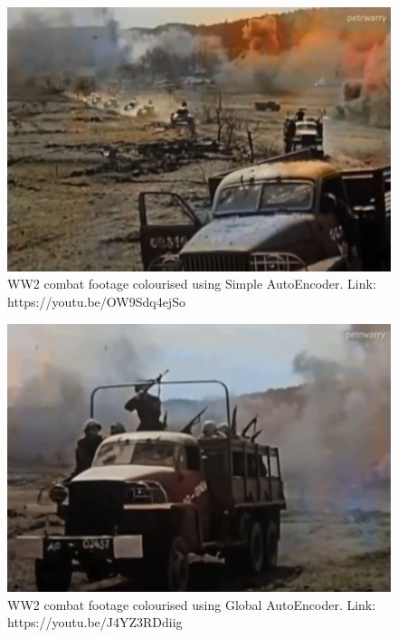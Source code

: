 \begin{figure}[H]
    \centering
    \includegraphics[width=1\columnwidth]{sections/appendix/ww2_colourisation1.JPG}
    \caption{WW2 combat footage colourised using Simple AutoEncoder. Link: https://youtu.be/OW9Sdq4ejSo}
    \label{fig:my_label}
\end{figure}


\begin{figure}[H]
    \centering
    \includegraphics[width=1\columnwidth]{sections/appendix/ww2_colourisation2.JPG}
    \caption{WW2 combat footage colourised using Global AutoEncoder. Link: https://youtu.be/J4YZ3RDdiig}
    \label{fig:my_label}
\end{figure}


